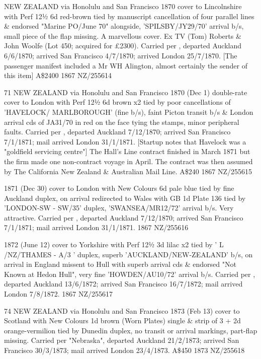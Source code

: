 \documentclass[justified]{tufte-book}
\begin{document}
%
{NEW ZEALAND
via Honolulu and San Francisco
1870 cover to Lincolnshire with Perf 12½ 6d red-brown tied by manuscript cancellation of four parallel lines \& endorsed "Marine PO/June 70" alongside, 'SPILSBY/JY29/70' arrival b/s, small piece of the flap missing. A marvellous cover. Ex TV (Tom) Roberts \& John Woolfe (Lot 450; acquired for \pounds{2300}). Carried per , departed Auckland 6/6/1870; arrived San Francisco 4/7/1870; arrived London 25/7/1870. [The passenger manifest included a Mr WH Alington, almost certainly the sender of this item]	
A\$2400 }%
{1867}%
{NZ/255614}%
{}%
{}
{}%
{}


%
{71
NEW ZEALAND
via Honolulu and San Francisco
1870 (Dec 1) double-rate cover to London with Perf 12½ 6d brown x2 tied by poor cancellations of 'HAVELOCK/ MARLBOROUGH' (fine b/s), faint Picton transit b/s \& London arrival cds of JA31/70 in red on the face tying the stamps, minor peripheral faults. Carried per , departed Auckland 7/12/1870; arrived San Francisco 7/1/1871; mail arrived London 31/1/1871. [Startup notes that Havelock was a "goldfield servicing centre"] The Hall's Line contract finished in March 1871 but the firm made one non-contract voyage in April. The contract was then assumed by The California New Zealand \& Australian Mail Line.
A\$240 }%
{1867}%
{NZ/255615}%
{}%
{}
{}%
{}


%
{1871 (Dec 30) cover to London with New Colours 6d pale blue tied by fine Auckland duplex, on arrival redirected to Wales with GB 1d Plate 136 tied by 'LONDON-SW - SW/35' duplex, 'SWANSEA/MR12/72' arrival b/s. Very attractive. Carried per , departed Auckland 7/12/1870; arrived San Francisco 7/1/1871; mail arrived London 31/1/1871. }%
{1867}%
{NZ/255616}%
{}%
{}
{}%
{}

%
{1872 (June 12) cover to Yorkshire with Perf 12½ 3d lilac x2 tied by ' L /NZ/THAMES - A/3 ' duplex, superb 'AUCKLAND/NEW-ZEALAND' b/s, on arrival in England missent to Hull with superb arrival cds \& endorsed "Not Known at Hedon Hull", very fine 'HOWDEN/AU10/72' arrival b/s. Carried per , departed Auckland 13/6/1872; arrived San Francisco 16/7/1872; mail arrived London 7/8/1872.  }%
{1867}%
{NZ/255617}%
{}%
{}
{}%
{}

%
{74
NEW ZEALAND
via Honolulu and San Francisco
1873 (Feb 13) cover to Scotland with New Colours 1d brown (Worn Plates) single \& strip of 3 + 2d orange-vermilion tied by Dunedin duplex, no transit or arrival markings, part-flap missing. Carried per "Nebraska", departed Auckland 21/2/1873; arrived San Francisco 30/3/1873; mail arrived London 23/4/1873.	
A\$450 }%
{1873}%
{NZ/255618}%
{}%
{}
{}%
{}
\end{document}
